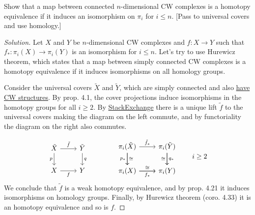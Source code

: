 \begin{exercise}[4.2.13]
	Show that a map between connected $n$-dimensional CW complexes is a homotopy equivalence if it induces an isomorphism on $\pi_i$ for $i\leq n$. [Pass to universal covers and use homology.]
\end{exercise}
\begin{proof}[Solution]
	Let $X$ and $Y$ be $n$-dimensional CW complexes and $f:X\to Y$ such that $f_*:\pi_i(X)\to\pi_i(Y)$ is an isomorphism for $i\leq n$. Let's try to use Hurewicz theorem, which states that a map between simply connected CW complexes is a homotopy equivalence if it induces isomorphisms on all homology groups.
	
	Consider the universal covers $\tilde{X}$ and $\tilde{Y}$, which are simply connected and also \href{https://math.stackexchange.com/questions/1148411/universal-covering-space-of-cw-complex-has-cw-complex-structure/1148918#1148918}{have CW structures}. By prop. 4.1, the cover projections induce isomorphisms in the homotopy groups for all $i\geq2$. By \href{https://math.stackexchange.com/questions/2206906/unique-map-of-universal-covering-space}{StackExchange} there is a unique lift $\tilde{f}$ to the universal covers making the diagram on the left commute, and by functoriality the diagram on the right also commutes.
	
	
	
	\[\begin{tikzcd}
		\tilde{X}\arrow[d,swap,"p"]\arrow[r,"\tilde{f}"]&\tilde{Y}\arrow[d,"q"]\\
		X\arrow[r,"f",swap]&Y
	\end{tikzcd}\qquad\qquad
	\begin{tikzcd}
		\pi_i(\tilde{X})\arrow[r,"\tilde{f}_*"]\arrow[d,swap,"p_*"]\arrow[d,"\cong"]&\pi_i(\tilde{Y})\arrow[d,"q_*"]\arrow[d,swap,"\cong"]\\
		\pi_i(X)\arrow[r,"f_*",swap]\arrow[r,"\cong"]&\pi_i(Y)
	\end{tikzcd}\qquad i\geq2\]
	We conclude that $\tilde{f}$ {\color{red}is a weak homotopy equivalence}, and by prop. 4.21 it induces isomorphisms on homology groups. Finally, by Hurewicz theorem (coro. 4.33) it is an homotopy equivalence and so is $f$.
\end{proof}


